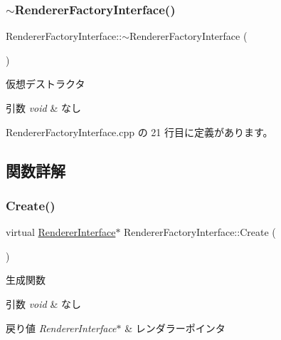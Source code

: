 \subsubsection{\texorpdfstring{$\sim$\+Renderer\+Factory\+Interface()}{~RendererFactoryInterface()}}
{\footnotesize\ttfamily Renderer\+Factory\+Interface\+::$\sim$\+Renderer\+Factory\+Interface (\begin{DoxyParamCaption}{ }\end{DoxyParamCaption})\hspace{0.3cm}{\ttfamily [pure virtual]}}



仮想デストラクタ 


\begin{DoxyParams}{引数}
{\em void} & なし \\
\hline
\end{DoxyParams}


 Renderer\+Factory\+Interface.\+cpp の 21 行目に定義があります。



\subsection{関数詳解}
\mbox{\label{class_renderer_factory_interface_aa81911973b6079fda8489409385d71e3}} 
\subsubsection{\texorpdfstring{Create()}{Create()}}
{\footnotesize\ttfamily virtual \mbox{\hyperlink{class_renderer_interface}{Renderer\+Interface}}$\ast$ Renderer\+Factory\+Interface\+::\+Create (\begin{DoxyParamCaption}{ }\end{DoxyParamCaption})\hspace{0.3cm}{\ttfamily [pure virtual]}}



生成関数 


\begin{DoxyParams}{引数}
{\em void} & なし \\
\hline
\end{DoxyParams}

\begin{DoxyRetVals}{戻り値}
{\em Renderer\+Interface$\ast$} & レンダラーポインタ \\
\hline
\end{DoxyRetVals}



